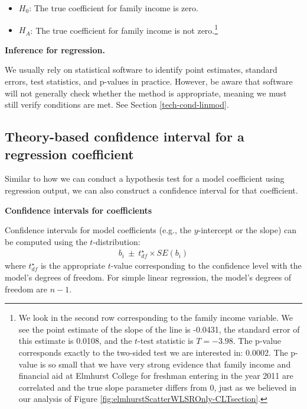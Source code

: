 \documentclass[
  10pt,
  openany]{book}
\providecommand{\tightlist}{%
  \setlength{\itemsep}{0pt}\setlength{\parskip}{0pt}}
\theoremstyle{definition}
\theoremstyle{definition}
\theoremstyle{definition}
\theoremstyle{definition}
\theoremstyle{remark}
\begin{document}
\begin{itemize}
\tightlist
\item
  \(H_0\): The true coefficient for family income is zero.\\
\item
  \(H_A\): The true coefficient for family income is not zero.\footnote{We look in the second row corresponding
    to the family income variable.
    We see the point estimate of the slope of the line is -0.0431,
    the standard error of this estimate is 0.0108, and the \(t\)-test
    statistic is \(T = -3.98\).
    The p-value corresponds exactly to the two-sided test we are
    interested in: 0.0002.
    The p-value is so small that we have very strong evidence that family income and financial aid at Elmhurst
    College for freshman entering in the year 2011 are
    correlated and the true slope parameter differs from 0,
    just as we believed in our analysis of Figure \ref{fig:elmhurstScatterWLSROnly-CLTsection}.}
\end{itemize}

\textbf{Inference for regression.}

We usually rely on statistical software to
identify point estimates, standard errors, test statistics, and p-values
in practice. However, be aware that software will not generally check
whether the method is appropriate, meaning we must still verify
conditions are met. See Section \ref{tech-cond-linmod}.

\subsection{Theory-based confidence interval for a regression coefficient}\label{theory-based-confidence-interval-for-a-regression-coefficient}

Similar to how we can conduct a hypothesis test for a model coefficient
using regression output, we can also construct a confidence interval for
that coefficient.

\textbf{Confidence intervals for coefficients}

Confidence intervals for model
coefficients (e.g., the \(y\)-intercept or the slope) can be computed using the \(t\)-distribution:
\[\begin{aligned}
  b_i \ \pm\ t_{df}^{\star} \times SE(b_{i})
  \end{aligned}\] where \(t_{df}^{\star}\) is the appropriate \(t\)-value
corresponding to the confidence level with the model's degrees of
freedom. For simple linear regression, the model's degrees of freedom are \(n-1\).
\end{document}
